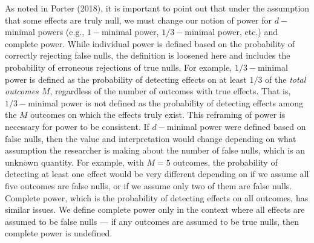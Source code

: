 \documentclass{article}
\begin{document}
As noted in Porter (2018), it is important to point out that under the
assumption that some effects are truly null, we must change our notion
of power for \(d-\)minimal powers (e.g., \(1-\)minimal power,
\(1/3-\)minimal power, etc.) and complete power. While individual power
is defined based on the probability of correctly rejecting false nulls,
the definition is loosened here and includes the probability of
erroneous rejections of true nulls. For example, \(1/3-\)minimal power
is defined as the probability of detecting effects on at least \(1/3\)
of the \emph{total outcomes \(M\)}, regardless of the number of outcomes
with true effects. That is, \(1/3-\)minimal power is not defined as the
probability of detecting effects among the \(M\) outcomes on which the
effects truly exist. This reframing of power is necessary for power to
be consistent. If \(d-\)minimal power were defined based on false nulls,
then the value and interpretation would change depending on what
assumption the researcher is making about the number of false nulls,
which is an unknown quantity. For example, with \(M = 5\) outcomes, the
probability of detecting at least one effect would be very different
depending on if we assume all five outcomes are false nulls, or if we
assume only two of them are false nulls. Complete power, which is the
probability of detecting effects on all outcomes, has similar issues. We
define complete power only in the context where all effects are assumed
to be false nulls --- if any outcomes are assumed to be true nulls, then
complete power is undefined.
\end{document}
